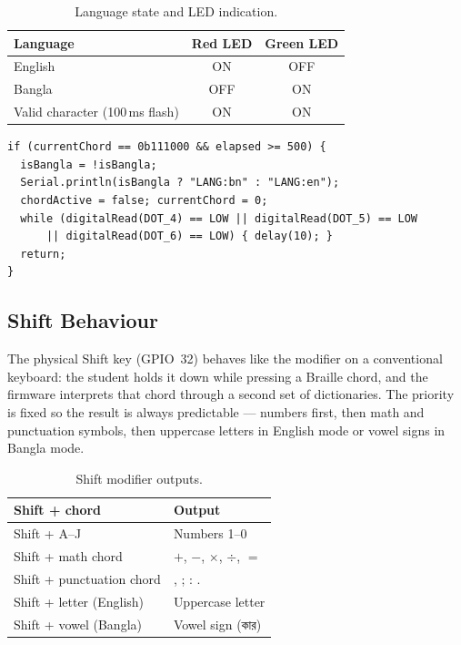 \documentclass[11pt,a4paper,twoside]{article}
\newcommand{\bengali}[1]{#1}
\begin{document}
\begin{table}[H]\centering
\caption{Language state and LED indication.}\label{tab:lang-led}
\begin{tabular}{l c c}\toprule
\textbf{Language} & \textbf{Red LED} & \textbf{Green LED} \\\midrule
English & ON & OFF \\
Bangla & OFF & ON \\
Valid character (100\,ms flash) & ON & ON \\\bottomrule
\end{tabular}\end{table}

\begin{lstlisting}[caption=Language toggle detection in the main loop.]
if (currentChord == 0b111000 && elapsed >= 500) {
  isBangla = !isBangla;
  Serial.println(isBangla ? "LANG:bn" : "LANG:en");
  chordActive = false; currentChord = 0;
  while (digitalRead(DOT_4) == LOW || digitalRead(DOT_5) == LOW
      || digitalRead(DOT_6) == LOW) { delay(10); }
  return;
}
\end{lstlisting}

\subsection{Shift Behaviour}
The physical Shift key (GPIO~32) behaves like the modifier on a
conventional keyboard: the student holds it down while pressing a
Braille chord, and the firmware interprets that chord through a second
set of dictionaries. The priority is fixed so the result is always
predictable --- numbers first, then math and punctuation symbols, then
uppercase letters in English mode or vowel signs in Bangla mode.

\begin{table}[H]\centering
\caption{Shift modifier outputs.}\label{tab:shift-outputs}
\begin{tabular}{l l}\toprule
\textbf{Shift + chord} & \textbf{Output} \\\midrule
Shift + A--J & Numbers 1--0 \\
Shift + math chord & $+$, $-$, $\times$, $\div$, $=$ \\
Shift + punctuation chord & , ; : . \\
Shift + letter (English) & Uppercase letter \\
Shift + vowel (Bangla) & Vowel sign (\bengali{কার}) \\\bottomrule
\end{tabular}\end{table}
\end{document}
